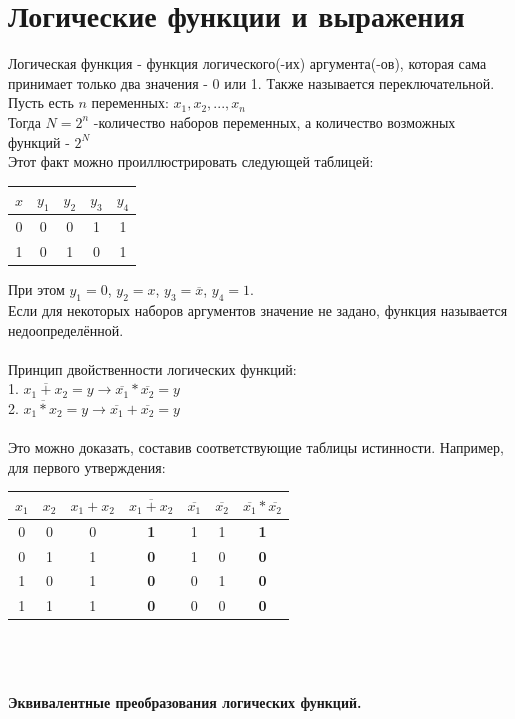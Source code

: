 \documentclass[a4paper,12pt]{report}
\begin{document}
\section{Логические функции и выражения}
Логическая функция - функция логического(-их) аргумента(-ов), которая сама принимает только два значения - 0 или 1. Также называется переключательной.\\
Пусть есть $n$ переменных: $x_1, x_2, ..., x_n$\\
Тогда $N=2^n$ -количество наборов переменных, а количество возможных функций - $2^N$\\
Этот факт можно проиллюстрировать следующей таблицей:\\
\begin{tabular}{ c | c | c | c | c }
  $x$ & $y_1$ & $y_2$ & $y_3$ & $y_4$ \\ \hline
  0 & 0 & 0 & 1 & 1 \\
  1 & 0 & 1 & 0 & 1\\  
\end{tabular}
При этом $y_1=0$, $y_2=x$, $y_3=\overline{x}$, $y_4=1$.\\
Если для некоторых наборов аргументов значение не задано, функция называется недоопределённой.\\
\\
Принцип двойственности логических функций:\\
1. $\overline{x_1+x_2}=y \to \overline{x_1}*\overline{x_2}=y$\\
2. $\overline{x_1*x_2}=y \to \overline{x_1}+\overline{x_2}=y$\\
\\
Это можно доказать, составив соответствующие таблицы истинности. Например, для первого утверждения:\\
\begin{tabular}{ c | c | c | c | c | c | c }
$x_1$ & $x_2$ & $x_1+x_2$ & $\overline{x_1+x_2}$ & $\overline{x_1}$ & $\overline{x_2}$ & $\overline{x_1}*\overline{x_2}$ \\ \hline
0 & 0 & 0 & \textbf{1} & 1 & 1 & \textbf{1} \\
0 & 1 & 1 & \textbf{0} & 1 & 0 & \textbf{0} \\
1 & 0 & 1 & \textbf{0} & 0 & 1 & \textbf{0} \\
1 & 1 & 1 & \textbf{0} & 0 & 0 & \textbf{0} \\
\end{tabular}\\
\\
\\
\textbf{Эквивалентные преобразования логических функций.}\\
\end{document}
